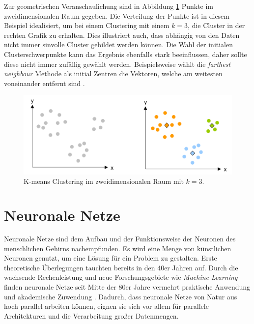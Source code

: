 Zur geometrischen Veranschaulichung sind in Abbildung \ref{img:kmeans} Punkte im zweidimensionalen Raum gegeben. Die Verteilung der Punkte ist in diesem Beispiel idealisiert, um bei einem Clustering mit einem $k = 3$, die Cluster in der rechten Grafik zu erhalten. Dies illustriert auch, dass abhängig von den Daten nicht immer sinvolle Cluster gebildet werden können. Die Wahl der initialen Clusterschwerpunkte kann das Ergebnis ebenfalls stark beeinflussen, daher sollte diese nicht immer zufällig gewählt werden. Beispielsweise wählt die \textit{farthest neighbour} Methode als initial Zentren die Vektoren, welche am weitesten voneinander entfernt sind \cite{mmd2011}.

\begin{figure}
	\centering
	\includegraphics[scale=0.55]{images/kmeans.png}
	\caption{K-means Clustering im zweidimensionalen Raum mit $k = 3$.}
	\label{img:kmeans}
\end{figure}

\section{Neuronale Netze}

Neuronale Netze sind dem Aufbau und der Funktionsweise der Neuronen des menschlichen Gehirns nachempfunden. Es wird eine Menge von künstlichen Neuronen genutzt, um eine Lösung für ein Problem zu gestalten. Erste theoretische Überlegungen tauchten bereits in den 40er Jahren auf. Durch die wachsende Rechenleistung und neue Forschungsgebiete wie \textit{Machine Learning} finden neuronale Netze seit Mitte der 80er Jahre vermehrt praktische Anwendung und akademische Zuwendung \cite{nnk2007}. Dadurch, dass neuronale Netze von Natur aus hoch parallel arbeiten können, eignen sie sich vor allem für parallele Architekturen und die Verarbeitung großer Datenmengen. 

